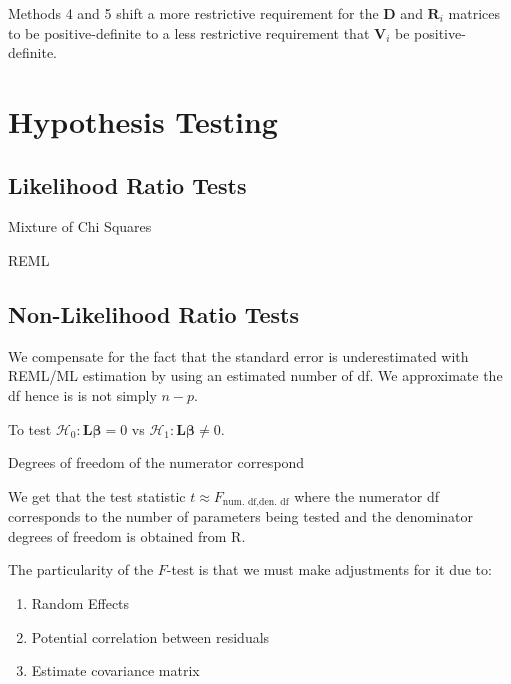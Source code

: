 \documentclass[english]{article}
\begin{document}
\begin{multicols*}{2}
Methods 4 and 5 shift a more restrictive requirement for the $\bm{D}$ and $\bm{R}_{i}$ matrices to be positive-definite to a less restrictive requirement that $\bm{V}_{i}$ be positive-definite.

\columnbreak
\section{Hypothesis Testing}\label{sec:BHypTesting}

\subsection{Likelihood Ratio Tests}\label{subsec:LRT}
Mixture of Chi Squares

REML


\subsection{Non-Likelihood Ratio Tests}
\begin{definitionNOHFILL}[$t$-test]

We compensate for the fact that the standard error is underestimated with REML/ML estimation by using an estimated number of df. We approximate the df hence is is not simply $n-p$.
\end{definitionNOHFILL}


\begin{definitionNOHFILL}[$F$-test]
To test $\mathcal{H}_{0}: \bm{L}\bm{\beta} = 0$ vs $\mathcal{H}_{1}: \bm{L}\bm{\beta} \neq 0$.  

\begin{rappel_enhanced}[Context]
Degrees of freedom of the numerator correspond
\end{rappel_enhanced}

We get that the test statistic $t \approx F_{\text{num. df}, \text{den. df}}$ where the numerator df corresponds to the number of parameters being tested and the denominator degrees of freedom is obtained from R. 

\bigskip

The particularity of the $F$-test is that we must make adjustments for it due to:
\begin{enumerate}
	\item	Random Effects
	\item	Potential correlation between residuals
	\item	Estimate covariance matrix
\end{enumerate}


\end{definitionNOHFILL}
\end{multicols*}
\end{document}
